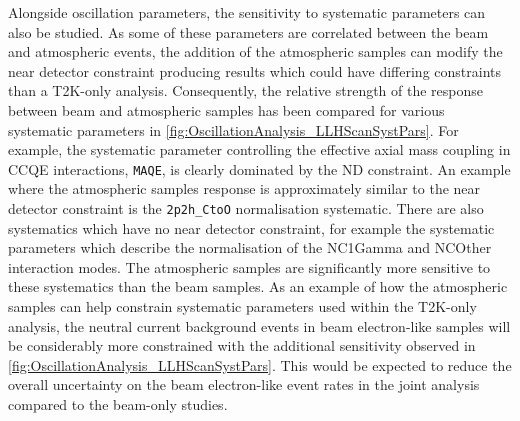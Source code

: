 \clearpage

Alongside oscillation parameters, the sensitivity to systematic parameters can also be studied. As some of these parameters are correlated between the beam and atmospheric events, the addition of the atmospheric samples can modify the near detector constraint producing results which could have differing constraints than a T2K-only analysis. Consequently, the relative strength of the response between beam and atmospheric samples has been compared for various systematic parameters in \autoref{fig:OscillationAnalysis_LLHScanSystPars}. For example, the systematic parameter controlling the effective axial mass coupling in CCQE interactions, \texttt{MAQE}, is clearly dominated by the ND constraint. An example where the atmospheric samples response is approximately similar to the near detector constraint is the \texttt{2p2h\_CtoO} normalisation systematic. There are also systematics which have no near detector constraint, for example the systematic parameters which describe the normalisation of the NC1Gamma and NCOther interaction modes. The atmospheric samples are significantly more sensitive to these systematics than the beam samples. As an example of how the atmospheric samples can help constrain systematic parameters used within the T2K-only analysis, the neutral current background events in beam electron-like samples will be considerably more constrained with the additional sensitivity observed in \autoref{fig:OscillationAnalysis_LLHScanSystPars}. This would be expected to reduce the overall uncertainty on the beam electron-like event rates in the joint analysis compared to the beam-only studies.

